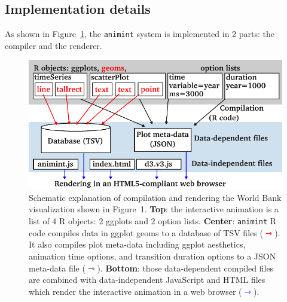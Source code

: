 \documentclass[journal]{vgtc}\usepackage[]{graphicx}\usepackage[]{color}
\begin{document}
\subsection{Implementation details}
\label{sec:implementation}

As shown in Figure~\ref{fig:design}, the \texttt{animint} system is implemented
in 2 parts: the compiler and the renderer.

\begin{figure}[b!]
  \centering
  \includegraphics[width=\columnwidth]{figure-design}
  \caption{Schematic explanation of compilation and rendering the
    World Bank visualization shown in Figure~1. \textbf{Top}: the
    interactive animation is a list of 4 R objects: 2 ggplots and 2
    option lists. \textbf{Center}: \texttt{animint} R code compiles data in
    ggplot geoms to a database of TSV files
    (\textcolor{red}{$\rightarrowtriangle$}). It also compiles plot
    meta-data including ggplot aesthetics, animation time
    options, and transition duration options to a JSON meta-data file
    ($\rightarrowtriangle$). \textbf{Bottom}: those data-dependent
    compiled files are combined with data-independent JavaScript and
    HTML files which render the interactive animation in a web browser
    (\textcolor{blue}{$\rightarrowtriangle$}).}
  \label{fig:design}
\end{figure}
\end{document}
